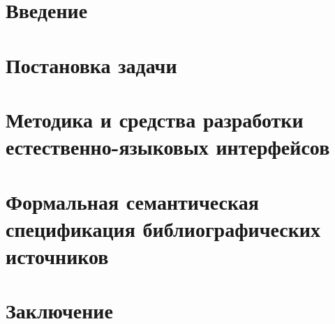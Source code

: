 \section*{Введение}


\newpage
\section{Постановка задачи}


\newpage
\section{Методика и средства разработки естественно-языковых интерфейсов}


\newpage
\section{Формальная семантическая спецификация библиографических источников}


\newpage
\section*{Заключение}

